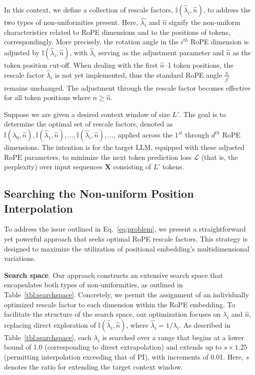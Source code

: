 In this context, we define a collection of rescale factors, $\mathbb{I}(\hat{\lambda}_{i},\hat{n})$, to address the two types of non-uniformities present. Here, $\hat{\lambda_i}$ and $\hat{n}$ signify the non-uniform characteristics related to RoPE dimensions and to the positions of tokens, correspondingly. More precisely, the rotation angle in the $i^{th}$ RoPE dimension is adjusted by $\mathbb{I}(\hat{\lambda}_{i},\hat{n})$, with $\hat\lambda_{i}$ serving as the adjustment parameter and $\hat{n}$ as the token position cut-off. When dealing with the first $\hat{n}$–1 token positions, the rescale factor $\hat\lambda_{i}$ is not yet implemented, thus the standard RoPE angle $\frac{n}{\beta^i}$ remains unchanged. The adjustment through the rescale factor becomes effective for all token positions where $n\ge\hat{n}$.

Suppose we are given a desired context window of size $L'$. The goal is to determine the optimal set of rescale factors, denoted as $\mathbb{I}(\hat{\lambda}_{0},\hat{n}), \mathbb{I}(\hat{\lambda}_{1},\hat{n}), \ldots, \mathbb{I}(\hat{\lambda}_{i},\hat{n}), \ldots$, applied across the $1^{st}$ through $d^{th}$ RoPE dimensions. The intention is for the target $\text{LLM}$, equipped with these adjusted $\text{RoPE}$ parameters, to minimize the next token prediction loss $\mathcal{L}$ (that is, the perplexity) over input sequences $\mathbf{X}$ consisting of $L'$ tokens.

\subsection{Searching the Non-uniform Position Interpolation}

To address the issue outlined in Eq.~\ref{eq:problem}, we present a straightforward yet powerful approach that seeks optimal RoPE rescale factors. This strategy is designed to maximize the utilization of positional embedding’s multidimensional variations.

\textbf{Search space}. Our approach constructs an extensive search space that encapsulates both types of non-uniformities, as outlined in Table~\ref{tbl:searchspace}. Concretely, we permit the assignment of an individually optimized rescale factor to each dimension within the RoPE embedding. To facilitate the structure of the search space, our optimization focuses on $\lambda_i$ and $\hat{n}$, replacing direct exploration of $\mathbb{I}(\hat{\lambda}_{i},\hat{n})$, where  $\hat{\lambda}_{i}=1/\lambda_i$. As described in Table~\ref{tbl:searchspace}, each $\lambda_i$ is searched over a range that begins at a lower bound of 1.0 (corresponding to direct extrapolation) and extends up to $s\times1.25$ (permitting interpolation exceeding that of PI), with increments of 0.01. Here, $s$ denotes the ratio for extending the target context window.

